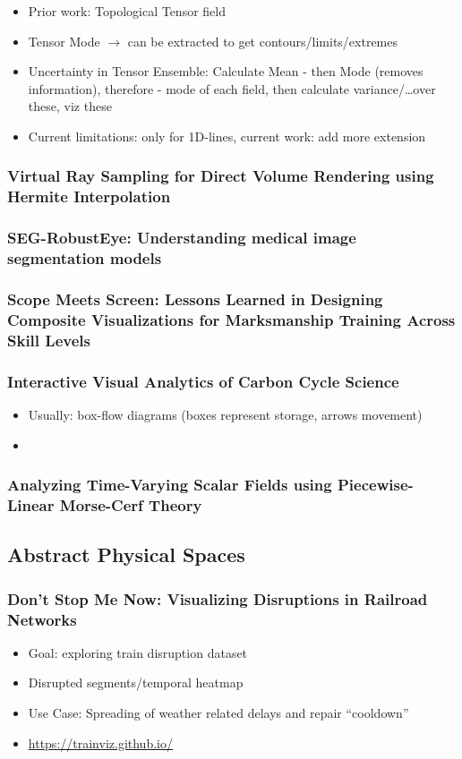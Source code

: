 \documentclass[a4paper]{article}
\begin{document}
\begin{itemize}
    \item Prior work: Topological Tensor field
    \item Tensor Mode $\rightarrow$ can be extracted to get contours/limits/extremes
    \item Uncertainty in Tensor Ensemble: Calculate Mean - then Mode (removes information), therefore - mode of each field, then calculate variance/\dots over these, viz these
    \item Current limitations: only for 1D-lines, current work: add more extension
\end{itemize}
\subsubsection{Virtual Ray Sampling for Direct Volume Rendering using Hermite Interpolation}
\subsubsection{SEG-RobustEye: Understanding medical image segmentation models}
\subsubsection{Scope Meets Screen: Lessons Learned in Designing Composite Visualizations for Marksmanship Training Across Skill Levels}
\subsubsection{Interactive Visual Analytics of Carbon Cycle Science}
\begin{itemize}
    \item Usually: box-flow diagrams (boxes represent storage, arrows movement)
    \item
\end{itemize}
\subsubsection{Analyzing Time-Varying Scalar Fields using Piecewise-Linear Morse-Cerf Theory}
\subsection{Abstract Physical Spaces}
\subsubsection{Don't Stop Me Now: Visualizing Disruptions in Railroad Networks}
\begin{itemize}
    \item Goal: exploring train disruption dataset
    \item Disrupted segments/temporal heatmap
    \item Use Case: Spreading of weather related delays and repair \enquote{cooldown}
    \item \url{https://trainviz.github.io/}
\end{itemize}
\end{document}
